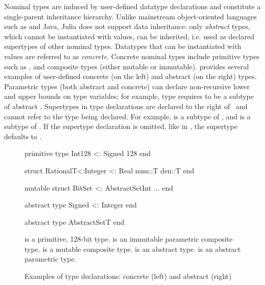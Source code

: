 Nominal types are induced by user-defined datatype declarations and constitute
a single-parent inheritance hierarchy.
Unlike mainstream object-oriented languages such as \CSharp and Java,
Julia does not support data inheritance: only \emph{abstract} types,
which cannot be instantiated with values, can be inherited,
i.e. used as declared supertypes of other nominal types.
Datatypes that can be instantiated with values are referred to as
\emph{concrete}. Concrete nominal types include primitive types
such as , and composite  types (either mutable or
immutable).
 provides several examples of user-defined
concrete (on the left) and abstract (on the right) types.
Parametric types (both abstract and concrete) 
can declare non-recursive lower and upper bounds on type variables;
for example, type  requires  to be a subtype of
abstract .
Supertypes in type declarations are declared to the right of~\cjl{<:}
and cannot refer to the type being declared.
For example,  is a subtype of , and  is a
subtype of . If the supertype declaration is omitted, like in
, the supertype defaults to .

\begin{figure}[t] 
\begin{minipage}{5.5cm}
\begin{julia}
primitive type Int128 <: Signed 128
end

struct Rational{T<:Integer} <: Real
  num::T
  den::T
end

mutable struct
  BitSet <: AbstractSet{Int}
  ...
end
\end{julia}
\end{minipage}
\hspace{1.2cm}
\begin{minipage}{4.8cm}
\begin{julia}
abstract type Signed <: Integer
end

abstract type AbstractSet{T}
end
\end{julia}
\end{minipage}
\caption{Examples of type declarations: concrete (left) and abstract (right)
}\label{fig:code:user-def-types}
\begin{tablenotes}[para]
\small
   is a primitive, 128-bit type.
   is an immutable parametric composite type.
   is a mutable composite type.
   is an abstract type.
   is an abstract parametric type.
\end{tablenotes}
\end{figure}

